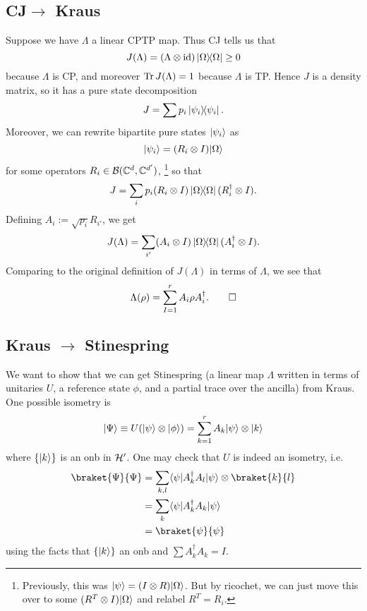\subsection*{CJ$\to$ Kraus}
Suppose we have $\Lambda$ a linear CPTP map. Thus CJ tells us that
\begin{equation*}
    J(\Lambda)=(\Lambda\otimes \operatorname{id})\left\lvert \Omega \middle\rangle\!\middle\langle \Omega \right\rvert \geq 0
\end{equation*}
because $\Lambda$ is CP, and moreover $\operatorname{Tr} J(\Lambda)=1$ because $\Lambda$ is TP. Hence $J$ is a density matrix, so it has a pure state decomposition
\begin{equation}
    J=\sum p_i \left\lvert \psi_i \middle\rangle\!\middle\langle \psi_i \right\rvert.
\end{equation}
Moreover, we can rewrite bipartite pure states $\lvert\psi_i\rangle$ as
\begin{equation}
    \lvert\psi_i\rangle=(R_i\otimes I)\lvert\Omega\rangle
\end{equation}
for some operators $R_i\in \mathcal{B}(\mathbb{C}^d,\mathbb{C}^{d'})$,%
    \footnote{Previously, this was $\lvert\psi\rangle=(I\otimes R)\lvert\Omega\rangle$. But by ricochet, we can just move this over to some $(R^T \otimes I)\lvert\Omega\rangle$ and relabel $R^T=R_i.$}
so that 
\begin{equation}
    J=\sum_i p_i (R_i\otimes I)\left\lvert \Omega \middle\rangle\!\middle\langle \Omega \right\rvert (R_i^\dagger \otimes I).
\end{equation}
Defining $A_i := \sqrt{p_i}R_{i'}$, we get
\begin{equation}
    J(\Lambda) = \sum_{i'} (A_i \otimes I)\left\lvert \Omega \middle\rangle\!\middle\langle \Omega \right\rvert (A^\dagger_i \otimes I).
\end{equation}
Comparing to the original definition of $J(\Lambda)$ in terms of $\Lambda$, we see that
\begin{equation}
    \Lambda(\rho)=\sum_{I=1}^r A_i \rho A_i^\dagger.\qed
\end{equation}

\subsection*{Kraus $\to$ Stinespring}
We want to show that we can get Stinespring (a linear map $\Lambda$ written in terms of unitaries $U$, a reference state $\phi$, and a partial trace over the ancilla) from Kraus. One possible isometry is
\begin{equation}
    \lvert\Psi\rangle \equiv U(\lvert\psi\rangle\otimes \lvert\phi\rangle) = \sum_{k=1}^r A_k \lvert\psi\rangle\otimes \lvert k\rangle
\end{equation}
where $\{\lvert k\rangle\}$ is an onb in $\mathcal H'$. One may check that $U$ is indeed an isometry, i.e.
\begin{align*}
    \braket{\Psi}{\Psi}&= \sum_{k,l} \bra{\psi} A_k^\dagger A_l \ket{\psi} \otimes \braket{k}{l}\\
        &= \sum_{k} \bra{\psi} A_k^\dagger A_k \ket{\psi}\\
        &=\braket{\psi}{\psi}
\end{align*}
using the facts that $\{\lvert k\rangle\}$ an onb and $\sum A_k^\dagger A_k=I$.

